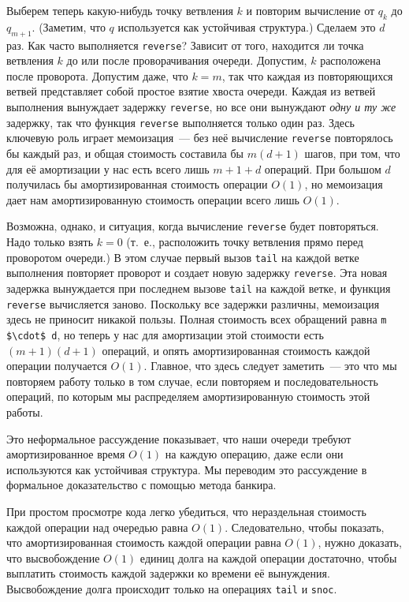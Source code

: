 Выберем теперь какую-нибудь точку ветвления $k$ и повторим вычисление
от $q_k$ до $q_{m+1}$. (Заметим, что $q$ используется как устойчивая
структура.) Сделаем это $d$ раз. Как часто выполняется
\lstinline!reverse!? Зависит от того, находится ли точка ветвления $k$
до или после проворачивания очереди. Допустим, $k$ расположена после
проворота. Допустим даже, что $k = m$, так что каждая из повторяющихся
ветвей представляет собой простое взятие хвоста очереди. Каждая из
ветвей выполнения вынуждает задержку \lstinline!reverse!, но все они
вынуждают \emph{одну и ту же} задержку, так что функция
\lstinline!reverse! выполняется только один раз. Здесь ключевую роль
играет мемоизация~--- без неё вычисление \lstinline!reverse!
повторялось бы каждый раз, и общая стоимость составила бы $m(d+1)$
шагов, при том, что для её амортизации у нас есть всего лишь $m + 1 +
d$ операций. При большом $d$ получилась бы амортизированная стоимость
операции $O(1)$, но мемоизация дает нам амортизированную стоимость
операции всего лишь $O(1)$.

Возможна, однако, и ситуация, когда вычисление \lstinline!reverse!
будет повторяться. Надо только взять $k = 0$ (т.~е., расположить точку
ветвления прямо перед проворотом очереди.) В этом случае первый вызов
\lstinline!tail! на каждой ветке выполнения повторяет проворот и
создает новую задержку \lstinline!reverse!. Эта новая задержка
вынуждается при последнем вызове \lstinline!tail! на каждой ветке, и
функция \lstinline!reverse! вычисляется заново. Поскольку все задержки
различны, мемоизация здесь не приносит никакой пользы. Полная
стоимость всех обращений равна \lstinline!m $\cdot$ d!, но теперь у нас
для амортизации этой стоимости есть $(m + 1)(d + 1)$ операций, и опять
амортизированная стоимость каждой операции получается $O(1)$. Главное,
что здесь следует заметить~--- это
 что мы повторяем работу только в том
случае, если повторяем и последовательность операций, по которым мы
распределяем амортизированную стоимость этой работы.

Это неформальное рассуждение показывает, что наши очереди требуют
амортизированное время $O(1)$ на каждую операцию, даже если они
используются как устойчивая структура. Мы переводим это рассуждение в
формальное доказательство с помощью метода банкира.

При простом просмотре кода легко убедиться, что нераздельная
стоимость каждой операции над очередью равна $O(1)$. Следовательно,
чтобы показать, что амортизированная стоимость каждой операции равна
$O(1)$, нужно доказать, что высвобождение $O(1)$ единиц долга на
каждой операции достаточно, чтобы выплатить стоимость каждой задержки
ко времени её вынуждения. Высвобождение долга происходит только на
операциях \lstinline!tail! и \lstinline!snoc!.

